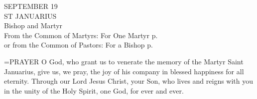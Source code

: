 \begin{center}\normalsize SEPTEMBER 19\\
\footnotesize ST JANUARIUS \\
\footnotesize Bishop and Martyr\\
\footnotesize From the Common of Martyrs: For One Martyr p.   \\
\footnotesize or from the Common of Pastors: For a Bishop p.\\
\end{center}

\hangindent=\parindent \small{PRAYER 
O God, who grant us to venerate
the memory of the Martyr Saint Januarius,
give us, we pray, the joy of his company
in blessed happiness for all eternity.
Through our Lord Jesus Christ, your Son,
who lives and reigns with you in the unity of the Holy Spirit,
one God, for ever and ever.\\}
 

